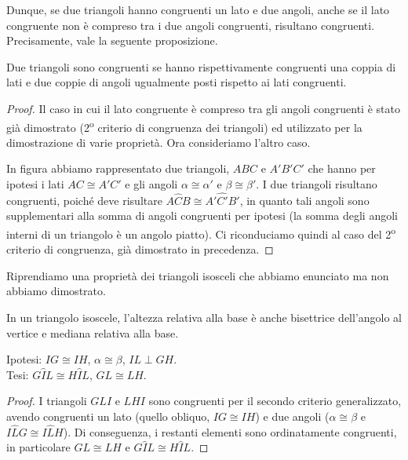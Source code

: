 Dunque, se due triangoli hanno congruenti un lato e due angoli, anche se il lato congruente non è compreso tra i due angoli congruenti, risultano congruenti. Precisamente, vale la seguente proposizione.

\begin{teorema}
Due triangoli sono congruenti se hanno rispettivamente congruenti una coppia di lati e due coppie di angoli ugualmente posti rispetto ai lati congruenti.
\end{teorema}

\begin{figure}[htb]
\centering
\end{figure}

\begin{proof}
Il caso in cui il lato congruente è compreso tra gli angoli congruenti è stato già dimostrato (2\textsuperscript{o} criterio di congruenza dei triangoli) ed utilizzato per la dimostrazione di varie proprietà. Ora consideriamo l'altro caso.

In figura abbiamo rappresentato due triangoli, $ABC$ e $A'B'C'$ che hanno per ipotesi i lati $AC\cong A'C'$ e gli angoli $\alpha\cong \alpha'$ e $\beta\cong \beta'$. I due triangoli risultano congruenti, poiché deve risultare $A\widehat{C}B\cong A'\widehat{C'}B'$, in quanto tali angoli sono supplementari alla somma di angoli congruenti per ipotesi (la somma degli angoli interni di un triangolo è un angolo piatto). Ci riconduciamo quindi al caso del 2\textsuperscript{o} criterio di congruenza, già dimostrato in precedenza.
\end{proof}

Riprendiamo una proprietà dei triangoli isosceli che abbiamo enunciato ma non abbiamo dimostrato.
\begin{proposizione}
In un triangolo isoscele, l'altezza relativa alla base è anche bisettrice dell'angolo al vertice e mediana relativa alla base.
\end{proposizione}

\noindent \begin{minipage}{0.6\textwidth}
\noindent Ipotesi: $IG\cong IH$, $\alpha\cong \beta$, $IL\perp GH$.\\
Tesi: $G\widehat{I}L\cong H\widehat{I}L$, $GL\cong LH$.

\begin{proof}
I triangoli $GLI$ e $LHI$ sono congruenti per il secondo criterio generalizzato, avendo congruenti un lato (quello obliquo, $IG\cong IH$) e due angoli ($\alpha\cong \beta$ e $I\widehat{L}G \cong I\widehat{L}H$). Di conseguenza, i restanti elementi sono ordinatamente congruenti, in particolare $GL\cong LH$ e $G\widehat{I}L\cong H\widehat{I}L$.
\end{proof}
\end{minipage}\hfil
\begin{minipage}{0.4\textwidth}
\centering
\end{minipage}

